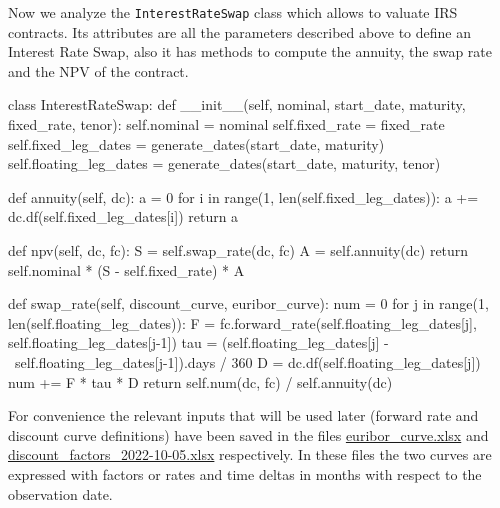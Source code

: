 \begin{finmarkets}
Now we analyze the \texttt{InterestRateSwap} class which allows to valuate IRS contracts. Its attributes are all the parameters described above to define an Interest Rate Swap, also it has methods to compute the annuity, the swap rate and the NPV of the contract. 
\end{finmarkets}

\begin{ipython}
class InterestRateSwap:
    def __init__(self, nominal, start_date, maturity, fixed_rate, tenor):
        self.nominal = nominal
        self.fixed_rate = fixed_rate
        self.fixed_leg_dates = generate_dates(start_date, maturity)
        self.floating_leg_dates = generate_dates(start_date, maturity, tenor)

    def annuity(self, dc):
        a = 0
        for i in range(1, len(self.fixed_leg_dates)):
            a += dc.df(self.fixed_leg_dates[i])
        return a

    def npv(self, dc, fc):
        S = self.swap_rate(dc, fc)
        A = self.annuity(dc)
        return self.nominal * (S - self.fixed_rate) * A

    def swap_rate(self, discount_curve, euribor_curve):
        num = 0
        for j in range(1, len(self.floating_leg_dates)):
            F = fc.forward_rate(self.floating_leg_dates[j], 
                                self.floating_leg_dates[j-1])
            tau = (self.floating_leg_dates[j] - \ 
                   self.floating_leg_dates[j-1]).days / 360
            D = dc.df(self.floating_leg_dates[j])
            num += F * tau * D
        return self.num(dc, fc) / self.annuity(dc)
\end{ipython}

For convenience the relevant inputs that will be used later (forward rate and discount curve definitions) have been saved in the files  \href{https://github.com/matteosan1/finance_course/raw/master/input_files/euribor_curve.xlsx}{euribor\_curve.xlsx} and \href{https://github.com/matteosan1/finance_course/raw/master/input_files/discount_factors_2022-10-05.xlsx}{discount\_factors\_2022-10-05.xlsx} respectively.
In these files the two curves are expressed with factors or rates and time deltas in months with respect to the observation date.

